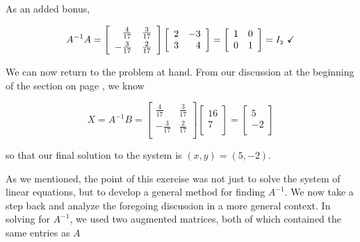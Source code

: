 As an added bonus, 

\[ A^{-1}A = \left[ \begin{array}{rr} \frac{4}{17} & \frac{3}{17} \\[3pt]  -\frac{3}{17} & \frac{2}{17} \\ \end{array} \right]\left[ \begin{array}{rr} 2 & -3 \\ 3 & 4 \\ \end{array} \right]  = \left[ \begin{array}{rr} 1 & 0 \\ 0 & 1 \\ \end{array} \right] = I_{\mbox{\tiny$2$}} \, \, \checkmark\]

We can now return to the problem at hand.  From our discussion at the beginning of the section on page \pageref{solvingmatrixeqn}, we know

\[ X = A^{-1}B = \left[ \begin{array}{rr} \frac{4}{17} & \frac{3}{17} \\[3pt]  -\frac{3}{17} & \frac{2}{17} \\ \end{array} \right]\left[ \begin{array}{r} 16 \\ 7 \\ \end{array} \right] = \left[ \begin{array}{r} 5 \\ -2 \\ \end{array} \right] \]

so that our final solution to the system is $(x,y) = (5,-2)$.   

\smallskip

As we mentioned, the point of this exercise was not just to solve the system of linear equations, but to develop a general method for finding $A^{-1}$.  We now take a step back and analyze the foregoing discussion in a more general context.  In solving for $A^{-1}$, we used two augmented matrices, both of which  contained the same entries as $A$

